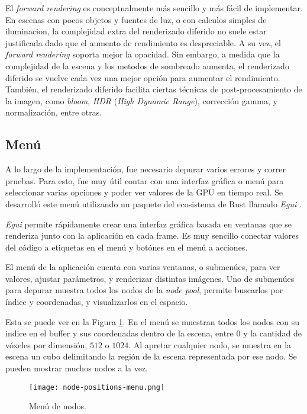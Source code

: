 El \textit{forward rendering} es conceptualmente más sencillo y más fácil de implementar.
En escenas con pocos objetos y fuentes de luz, o con calculos simples de iluminacion, la complejidad extra del renderizado diferido no suele estar justificada dado que el aumento de rendimiento es despreciable.
A su vez, el \textit{forward rendering} soporta mejor la opacidad.
Sin embargo, a medida que la complejidad de la escena y los metodos de sombreado aumenta, el renderizado diferido se vuelve cada vez una mejor opción para aumentar el rendimiento.
También, el renderizado diferido facilita ciertas técnicas de post-procesamiento de la imagen, como \textit{bloom}, \textit{HDR} (\textit{High Dynamic Range}), corrección gamma, y normalización, entre otras.

\subsection{Menú}

A lo largo de la implementación, fue necesario depurar varios errores y correr pruebas.
Para esto, fue muy útil contar con una interfaz gráfica o menú para seleccionar varias opciones y poder ver valores de la GPU en tiempo real.
Se desarrolló este menú utilizando un paquete del ecosistema de Rust llamado \textit{Egui} \cite{egui}.

\textit{Egui} permite rápidamente crear una interfaz gráfica basada en ventanas que se renderiza junto con la aplicación en cada frame.
Es muy sencillo conectar valores del código a etiquetas en el menú y botónes en el menú a acciones.

El menú de la aplicación cuenta con varias ventanas, o submenúes, para ver valores, ajustar parámetros, y renderizar distintas imágenes.
Uno de submenúes para depurar muestra todos los nodos de la \textit{node pool}, permite buscarlos por índice y coordenadas, y visualizarlos en el espacio.

Esta se puede ver en la Figura \ref{fig:node-positions-menu}.
En el menú se muestran todos los nodos con su indice en el buffer y sus coordenadas dentro de la escena, entre $0$ y la cantidad de vóxeles por dimensión, $512$ o $1024$.
Al apretar cualquier nodo, se muestra en la escena un cubo delimitando la región de la escena representada por ese nodo.
Se pueden mostrar muchos nodos a la vez.

\begin{figure}
    \centering
    \texttt{[image: node-positions-menu.png]}
    \caption{Menú de nodos.}
    \label{fig:node-positions-menu}
\end{figure}

